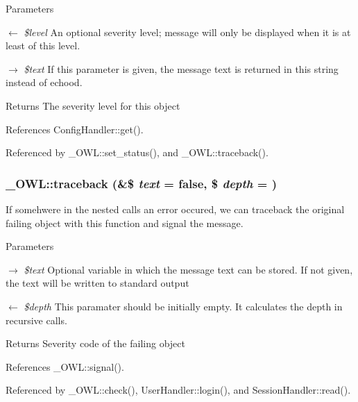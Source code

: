 \begin{DoxyParams}{Parameters}
\item[\mbox{$\leftarrow$} {\em \$level}]An optional severity level; message will only be displayed when it is at least of this level. \item[\mbox{$\rightarrow$} {\em \$text}]If this parameter is given, the message text is returned in this string instead of echood. \end{DoxyParams}
\begin{DoxyReturn}{Returns}
The severity level for this object 
\end{DoxyReturn}


References ConfigHandler::get().



Referenced by \_\-OWL::set\_\-status(), and \_\-OWL::traceback().

\subsubsection[{traceback}]{\setlength{\rightskip}{0pt plus 5cm}\_\-OWL::traceback (\&\$ {\em text} = {\ttfamily false}, \/  \$ {\em depth} = {})}\label{class__OWL_aa29547995d6741b7d2b90c1d4ea99a13}
If somehwere in the nested calls an error occured, we can traceback the original failing object with this function and signal the message.


\begin{DoxyParams}{Parameters}
\item[\mbox{$\rightarrow$} {\em \$text}]Optional variable in which the message text can be stored. If not given, the text will be written to standard output \item[\mbox{$\leftarrow$} {\em \$depth}]This paramater should be initially empty. It calculates the depth in recursive calls. \end{DoxyParams}
\begin{DoxyReturn}{Returns}
Severity code of the failing object 
\end{DoxyReturn}


References \_\-OWL::signal().



Referenced by \_\-OWL::check(), UserHandler::login(), and SessionHandler::read().



